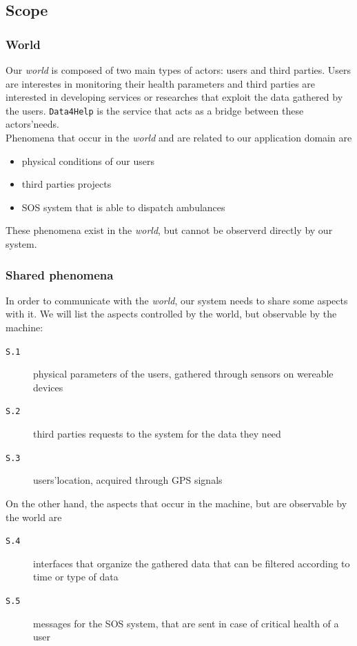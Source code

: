 \documentclass[12pt]{article}
\begin{document}
  \subsection{Scope}

    \subsubsection{World}

      Our \textit{world} is composed of two main types of actors: users and third parties. Users are interestes in monitoring their health parameters and third parties are interested in developing services or researches that exploit the data gathered by the users. \texttt{Data4Help} is the service that acts as a bridge between these actors'needs. \\
      Phenomena that occur in the \textit{world} and are related to our application domain are
      \begin{itemize}
        \item physical conditions of our users
        \item third parties projects
        \item SOS system that is able to dispatch ambulances
      \end{itemize}
      These phenomena exist in the \textit{world}, but cannot be observerd directly by our system.

    \subsubsection{Shared phenomena}
    \label{sec:sharedp}

      In order to communicate with the \textit{world}, our system needs to share some aspects with it. We will list the aspects controlled by the world, but observable by the machine:
      \begin{description}
        \item[\texttt{S.1}] physical parameters of the users, gathered through sensors on wereable devices
        \item[\texttt{S.2}] third parties requests to the system for the data they need
        \item[\texttt{S.3}] users'location, acquired through GPS signals
      \end{description}
      On the other hand, the aspects that occur in the machine, but are observable by the world are
      \begin{description}
        \item[\texttt{S.4}] interfaces that organize the gathered data that can be filtered according to time or type of data
        \item[\texttt{S.5}] messages for the SOS system, that are sent in case of critical health of a user
      \end{description}
\end{document}
